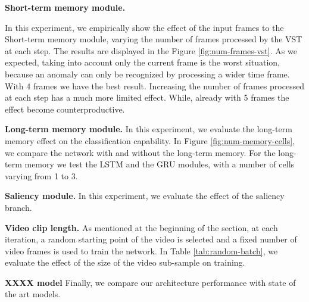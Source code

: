 
\noindent\textbf{Short-term memory module.}

In this experiment, we empirically show the effect of the input frames to the Short-term memory module, varying the number of frames processed by the VST at each step.
The results are displayed in the Figure \ref{fig:num-frames-vst}.
As we expected, taking into account only the current frame is the worst situation, because an anomaly can only be recognized by processing a wider time frame.
With 4 frames we have the best result.
Increasing the number of frames processed at each step has a much more limited effect.
While, already with 5 frames the effect become counterproductive.


\noindent\textbf{Long-term memory module.}
In this experiment, we evaluate the long-term memory effect on the classification capability.
In Figure \ref{fig:num-memory-cells}, we compare the network with and without the long-term memory.
For the long-term memory we test the LSTM and the GRU modules, with a number of cells varying from 1 to 3.

\noindent\textbf{Saliency module.}
In this experiment, we evaluate the effect of the saliency branch.

\noindent\textbf{Video clip length.}
As mentioned at the beginning of the section, at each iteration, a random starting point of the video is selected and a fixed number of video frames is used to train the network.
In Table \ref{tab:random-batch}, we evaluate the effect of the size of the video sub-sample on training.

\noindent\textbf{XXXX model}
Finally, we compare our architecture performance with state of the art models.